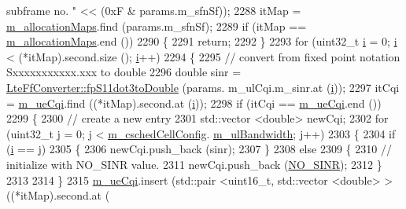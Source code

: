 \begin{DoxyCode}
{       subframe no. "} << (0xF & params.m\_sfnSf));
2288         itMap = \hyperlink{classns3_1_1PssFfMacScheduler_ad06e7461edc613eb44a4a9c474915022}{m\_allocationMaps}.find (params.m\_sfnSf);
2289         \textcolor{keywordflow}{if} (itMap == \hyperlink{classns3_1_1PssFfMacScheduler_ad06e7461edc613eb44a4a9c474915022}{m\_allocationMaps}.end ())
2290           \{
2291             \textcolor{keywordflow}{return};
2292           \}
2293         \textcolor{keywordflow}{for} (uint32\_t \hyperlink{bernuolliDistribution_8m_a6f6ccfcf58b31cb6412107d9d5281426}{i} = 0; \hyperlink{bernuolliDistribution_8m_a6f6ccfcf58b31cb6412107d9d5281426}{i} < (*itMap).second.size (); \hyperlink{bernuolliDistribution_8m_a6f6ccfcf58b31cb6412107d9d5281426}{i}++)
2294           \{
2295             \textcolor{comment}{// convert from fixed point notation Sxxxxxxxxxxx.xxx to double}
2296             \textcolor{keywordtype}{double} sinr = \hyperlink{classns3_1_1LteFfConverter_aa5d8c2a8f988dbd63da91818c18666eb}{LteFfConverter::fpS11dot3toDouble} (params.
      m\_ulCqi.m\_sinr.at (\hyperlink{bernuolliDistribution_8m_a6f6ccfcf58b31cb6412107d9d5281426}{i}));
2297             itCqi = \hyperlink{classns3_1_1PssFfMacScheduler_abd1f917911a86bfd576e93ec67d7b8b2}{m\_ueCqi}.find ((*itMap).second.at (\hyperlink{bernuolliDistribution_8m_a6f6ccfcf58b31cb6412107d9d5281426}{i}));
2298             \textcolor{keywordflow}{if} (itCqi == \hyperlink{classns3_1_1PssFfMacScheduler_abd1f917911a86bfd576e93ec67d7b8b2}{m\_ueCqi}.end ())
2299               \{
2300                 \textcolor{comment}{// create a new entry}
2301                 std::vector <double> newCqi;
2302                 \textcolor{keywordflow}{for} (uint32\_t j = 0; j < \hyperlink{classns3_1_1PssFfMacScheduler_a6808e2b2024ed0ced82f80bfe6f0801f}{m\_cschedCellConfig}.
      \hyperlink{structns3_1_1FfMacCschedSapProvider_1_1CschedCellConfigReqParameters_a5ab5b102878e6e7e7727a14af4a64d2f}{m\_ulBandwidth}; j++)
2303                   \{
2304                     \textcolor{keywordflow}{if} (\hyperlink{bernuolliDistribution_8m_a6f6ccfcf58b31cb6412107d9d5281426}{i} == j)
2305                       \{
2306                         newCqi.push\_back (sinr);
2307                       \}
2308                     \textcolor{keywordflow}{else}
2309                       \{
2310                         \textcolor{comment}{// initialize with NO\_SINR value.}
2311                         newCqi.push\_back (\hyperlink{cqa-ff-mac-scheduler_8h_a520d71777be043568160c783a9c65fd5}{NO\_SINR});
2312                       \}
2313 
2314                   \}
2315                 \hyperlink{classns3_1_1PssFfMacScheduler_abd1f917911a86bfd576e93ec67d7b8b2}{m\_ueCqi}.insert (std::pair <uint16\_t, std::vector <double> > ((*itMap).second.at (

\end{DoxyCode}
